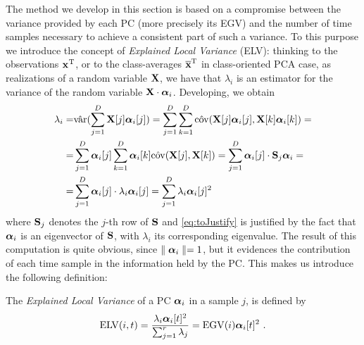 The method we develop in this section is based on a compromise between the variance provided by each PC (more precisely its EGV) and the number of time samples necessary to achieve a consistent part of such a variance. To this purpose we  introduce the concept of {\em Explained Local Variance} (ELV): thinking to the observations ${\sss[]{}}^\mathrm{T}$, or to the class-averages ${\mmmX}^\mathrm{T}$ in class-oriented PCA case, as realizations of a random variable $\XXX$, we have that $\lambda_i$ is an estimator for the variance of the random variable $\XXX\cdot\AAlpha_i$. Developing, we obtain
\begin{align}\label{eq:ELV}
\lambda_i =& \hat{\mathrm{var}}(\sum_{j=1}^D \XXX[j]\AAlpha_i[j]) = \sum_{j=1}^D\sum_{k=1}^D \hat{\mathrm{cov}}(\XXX[j]\AAlpha_i[j], \XXX[k]\AAlpha_i[k])=\\
=& \sum_{j=1}^D \AAlpha_i[j]\sum_{k=1}^D\AAlpha_i[k]\hat{\mathrm{cov}}(\XXX[j], \XXX[k])= \sum_{j=1}^D \AAlpha_i[j]\cdot \covmat_{j} \AAlpha_i=  \\
=& \sum_{j=1}^D \AAlpha_i[j]\cdot \lambda_i\AAlpha_i[j]= \sum_{j=1}^D  \lambda_i \AAlpha_i[j]^2 \label{eq:toJustify}
\end{align}
where $\covmat_{j}$ denotes the $j$-th row of $\covmat$ and \eqref{eq:toJustify} is justified by the fact that $\AAlpha_i$ is an eigenvector of $\covmat$, with $\lambda_i$ its corresponding eigenvalue. The result of this computation is quite obvious, since $\parallel \AAlpha_i\parallel=1$, but it evidences the contribution of each time sample in the information held by the PC. This makes us introduce the following definition:
\begin{definition}
The {\em Explained Local Variance} of a PC $\AAlpha_i$ in a sample $j$, is defined by
\begin{equation}
\mathrm{ELV}(i,t) = \frac{\lambda_i \AAlpha_i[t]^2}{\sum_{j=1}^r\lambda_j} = \mathrm{EGV}(i) \AAlpha_i[t]^2  \mbox{ .}
\end{equation}
\end{definition}
